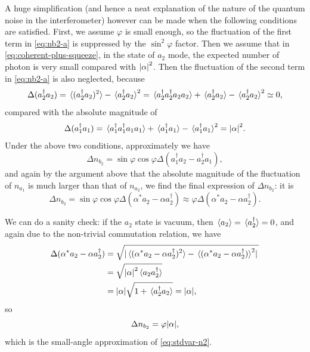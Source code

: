 \documentclass[hyperref, a4paper]{article}
\begin{document}
A huge simplification 
(and hence a neat explanation of the nature of the quantum noise in the interferometer) 
however can be made when the following conditions are satisfied.
First, we assume $\varphi$ is small enough, 
so the fluctuation of the first term in \eqref{eq:nb2-a} is suppressed by the $\sin^2 \varphi$ factor.
Then we assume that in \eqref{eq:coherent-plus-squeeze},
in the state of $a_2$ mode, the expected number of photon 
is very small compared with $\abs{\alpha}^2$.
Then the fluctuation of the second term in \eqref{eq:nb2-a} is also neglected,
because 
\begin{equation}
    \Delta (a_2^\dagger a_2) = \expval*{ (a_2^\dagger a_2)^2 } - \expval*{ a_2^\dagger a_2 }^2 = 
    \expval*{a_2^\dagger a_2^\dagger a_2 a_2} + \expval*{a_2^\dagger a_2} - \expval*{ a_2^\dagger a_2 }^2 \simeq 0,
\end{equation}
compared with the absolute magnitude of 
\begin{equation}
    \Delta (a_1^\dagger a_1) = 
    \expval*{a_1^\dagger a_1^\dagger a_1 a_1} + \expval*{a_1^\dagger a_1} - \expval*{ a_1^\dagger a_1 }^2 
    = \abs{\alpha}^2.
\end{equation}
Under the above two conditions, approximately we have 
\begin{equation}
    \Delta n_{b_2} = \sin \varphi \cos \varphi \Delta (a_1^\dagger a_2 - a_2^\dagger a_1 ) ,
\end{equation}
and again by the argument above that 
the absolute magnitude of the fluctuation of $n_{a_1}$ 
is much larger than that of $n_{a_2}$,
we find the final expression of $\Delta n_{b_2}$: 
it is 
\begin{equation}
    \Delta n_{b_2} = \sin \varphi \cos \varphi \Delta (\alpha^* a_2 - \alpha a_2^\dagger)
    \approx \varphi \Delta (\alpha^* a_2 - \alpha a_2^\dagger).
    \label{eq:nb2-single-mode}
\end{equation}

We can do a sanity check:
if the $a_2$ state is vacuum,
then $\expval*{a_2} = \expval*{a_2^\dagger} = 0$, 
and again due to the non-trivial commutation relation, we have 
\begin{equation}
    \begin{aligned}
        \Delta (\alpha^* a_2 - \alpha a_2^\dagger)
        &= \sqrt{ \abs*{\expval*{ (\alpha^* a_2 - \alpha a_2^\dagger)^2 } 
        - \expval*{(\alpha^* a_2 - \alpha a_2^\dagger)}^2} } \\
        &= \sqrt{
            \abs{\alpha}^2 \expval*{a_2 a_2^\dagger}
        } \\
        &= \abs{\alpha} \sqrt{ 1 + \expval*{a^\dagger_2 a_2} } = \abs{\alpha},
    \end{aligned}
\end{equation}
so 
\begin{equation}
    \Delta n_{b_2} = \varphi \abs{\alpha},
\end{equation}
which is the small-angle approximation of \eqref{eq:stdvar-n2}.
\end{document}
